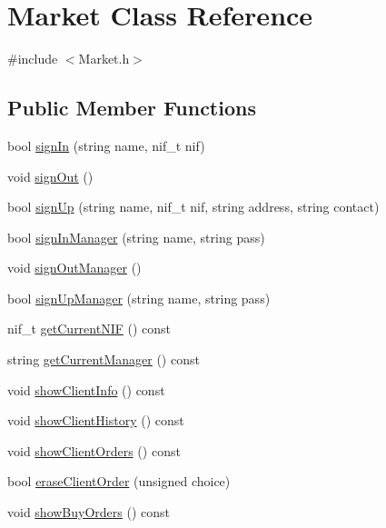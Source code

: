 \hypertarget{class_market}{}\section{Market Class Reference}
\label{class_market}


{\ttfamily \#include $<$Market.\+h$>$}

\subsection*{Public Member Functions}
\begin{DoxyCompactItemize}
\item 
bool \hyperlink{class_market_a6b0d677963c278fc238c1efdd29ba43e}{sign\+In} (string name, nif\+\_\+t nif)
\item 
void \hyperlink{class_market_acbd4a1e28685f78b6b2c59aa5ca9874f}{sign\+Out} ()
\item 
bool \hyperlink{class_market_ae575e2c591bd3e14bae27b81cfecada9}{sign\+Up} (string name, nif\+\_\+t nif, string address, string contact)
\item 
bool \hyperlink{class_market_a036f56168e25a9ee71a6d0818641ac10}{sign\+In\+Manager} (string name, string pass)
\item 
void \hyperlink{class_market_a59f7b338118ec5b93624a4e6ab62ba6d}{sign\+Out\+Manager} ()
\item 
bool \hyperlink{class_market_a716ee722e79de53b8a191a6bd1bb48dd}{sign\+Up\+Manager} (string name, string pass)
\item 
nif\+\_\+t \hyperlink{class_market_acc909b8410ea76b1dfecf92088264741}{get\+Current\+N\+IF} () const
\item 
string \hyperlink{class_market_ad64fc7b35bb0b060345ff1bd0fbe2f51}{get\+Current\+Manager} () const
\item 
void \hyperlink{class_market_ad55d5db41984c8c4f1f027cd1f720a0b}{show\+Client\+Info} () const
\item 
void \hyperlink{class_market_ab12d4a35aed820924483f336948cf4b4}{show\+Client\+History} () const
\item 
void \hyperlink{class_market_aa81ff10670a6d41b22573cb48c40938e}{show\+Client\+Orders} () const
\item 
bool \hyperlink{class_market_a84df7da0cc63a1ff6d22e467e5060758}{erase\+Client\+Order} (unsigned choice)
\item 
void \hyperlink{class_market_aa6a0bba5a4f5fdd7fa4ffecb50c90c3b}{show\+Buy\+Orders} () const
\item 

\end{DoxyCompactItemize}
